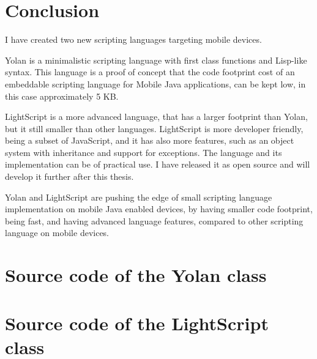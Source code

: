 \documentclass[11pt]{report}
\begin{document}
\chapter{Conclusion}
\label{conclusion}
I have created two new scripting languages targeting mobile devices.

Yolan is a minimalistic scripting language with first class functions and Lisp-like syntax. This language is a proof of concept that the code footprint cost of an embeddable scripting language for Mobile Java applications, can be kept low, in this case approximately 5 KB.

LightScript is a more advanced language, that has a larger footprint than Yolan, but it still smaller than other languages. LightScript is more developer friendly, being a subset of JavaScript, and it has also more features, such as an object system with inheritance and support for exceptions.
The language and its implementation can be of practical use. I have released it as open source and will develop it further after this thesis.

Yolan and LightScript are pushing the edge of small scripting language implementation on mobile Java enabled devices, by having smaller code footprint, being fast, and having advanced language features, compared to other scripting language on mobile devices.


%
%

\newpage
{}



\appendix

%


\chapter{Source code of the Yolan class}


\chapter{Source code of the LightScript class}



\newpage
{}
\printindex
\end{document}
